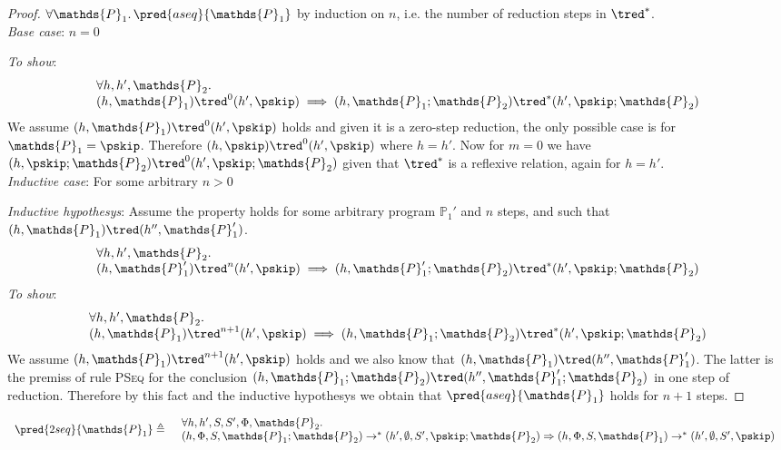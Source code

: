 {\parindent0pt
\begin{proof}
$\forall \mathds{P}_1 \ldotp \pred{aseq}{\mathds{P}_1}$ by induction on $n$, i.e. the number of reduction steps in $\tred^*$. \\

\textit{Base case}: $n = 0$

\textit{To show}: 
\[
\begin{array}{l}
\forall h, h', \mathds{P}_2 \ldotp \\
(h, \mathds{P}_1) \tred^0 (h', \pskip) \implies 
(h, \mathds{P}_1; \mathds{P}_2) \tred^* (h', \pskip; \mathds{P}_2)
\end{array}
\]
We assume $(h, \mathds{P}_1) \tred^0 (h', \pskip)$ holds and given it is a zero-step reduction, the only possible case is for $\mathds{P}_1 = \pskip$. Therefore $(h, \pskip) \tred^0 (h', \pskip)$ where $h = h'$. Now for $m = 0$ we have $(h, \pskip; \mathds{P}_2) \tred^0 (h', \pskip; \mathds{P}_2)$ given that $\tred^*$ is a reflexive relation, again for $h = h'$. \\

\textit{Inductive case}: For some arbitrary $n > 0$

\textit{Inductive hypothesys}: Assume the property holds for some arbitrary program $\mathds{P}_1'$ and $n$ steps, and such that $(h, \mathds{P}_1) \tred (h'', \mathds{P}_1')$.
\[
\begin{array}{l}
\forall h, h', \mathds{P}_2 \ldotp \\
(h, \mathds{P}_1') \tred^n (h', \pskip) \implies 
(h, \mathds{P}_1'; \mathds{P}_2) \tred^* (h', \pskip; \mathds{P}_2)
\end{array}
\]
\textit{To show}:
\[
\begin{array}{l}
\forall h, h', \mathds{P}_2 \ldotp \\
(h, \mathds{P}_1) \tred^{n+1} (h', \pskip) \implies 
(h, \mathds{P}_1; \mathds{P}_2) \tred^* (h', \pskip; \mathds{P}_2)
\end{array}
\]
We assume $(h, \mathds{P}_1) \tred^{n+1} (h', \pskip)$ holds and we also know that $(h, \mathds{P}_1) \tred (h'', \mathds{P}_1')$. The latter is the premiss of rule \textsc{PSeq} for the conclusion $(h, \mathds{P}_1; \mathds{P}_2) \tred (h'', \mathds{P}_1'; \mathds{P}_2)$ in one step of reduction. Therefore by this fact and the inductive hypothesys we obtain that $\pred{aseq}{\mathds{P}_1}$ holds for $n + 1$ steps.

\end{proof}
}

\lem \label{ref:2seq}
\[
\begin{array}{r l}
	\pred{2seq}{\mathds{P}_1} \triangleq
	&
	\begin{array}{l}
	\forall h, h', S, S', \Phi, \mathds{P}_2 \ldotp \\ 
	(h, \Phi, S, \mathds{P}_1; \mathds{P}_2) \rightarrow^* (h', \emptyset, S', \pskip; \mathds{P}_2)
	\Rightarrow
	(h, \Phi, S, \mathds{P}_1) \rightarrow^* (h', \emptyset, S', \pskip)
	\end{array}
\end{array}
\]

